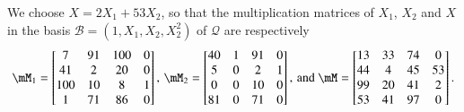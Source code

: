 \documentclass[final,1p,times,authoryear]{elsarticle}
\newcommand{\basis}{\mathscr{B}}
\newcommand{\lf}{X}
\newcommand{\residueI}{\mathscr{Q}}
\begin{document}
We choose $\lf = 2X_1 + 53 X_2$, so that the multiplication matrices of $X_1$, $X_2$ and $\lf$
in the basis $\basis=(1,X_1,X_2,X_2^2)$ of $\residueI$ are respectively
\begin{align*}
  \mM_1 = \begin{bmatrix}
    7   & 91 & 100& 0\\
    41  & 2  & 20 & 0\\
    100 & 10 & 8  & 1\\
    1   & 71 & 86 & 0
  \end{bmatrix},\,
  \mM_2 = \begin{bmatrix}
    40&  1 & 91 & 0\\
    5 &  0 &  2 & 1\\
    0 &  0 & 10 & 0\\
    81&  0 & 71 & 0
  \end{bmatrix},\,\text{and }
  \mM = \begin{bmatrix}
    13 & 33&  74&  0\\
    44 &  4&  45&  53\\
    99 & 20&  41&  2\\
    53 & 41&  97&  0
  \end{bmatrix}.
\end{align*}
\end{document}
